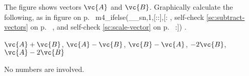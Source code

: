  The figure shows vectors $\vc{A}$ and $\vc{B}$. 
Graphically calculate the following, as in 
figure  on p.~\pageref{fig:tip-to-tail}%
m4_ifelse(__sn,1,[::],[:%
, self-check
\ref{sc:subtract-vectors} on p.~\pageref{sc:subtract-vectors}%
, and self-check \ref{sc:scale-vector} on p.~\pageref{sc:scale-vector}%
:])%
.

         $\vc{A}+\vc{B}$,  $\vc{A}-\vc{B}$,  $\vc{B}-\vc{A}$,  $-2\vc{B}$,  $\vc{A}-2\vc{B}$

\noindent No numbers are involved.
